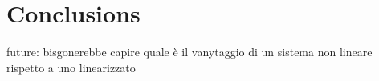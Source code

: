 \chapter{Conclusions}
\label{conclusions}


future: bisgonerebbe capire quale è il vanytaggio di un sistema non lineare rispetto a uno linearizzato